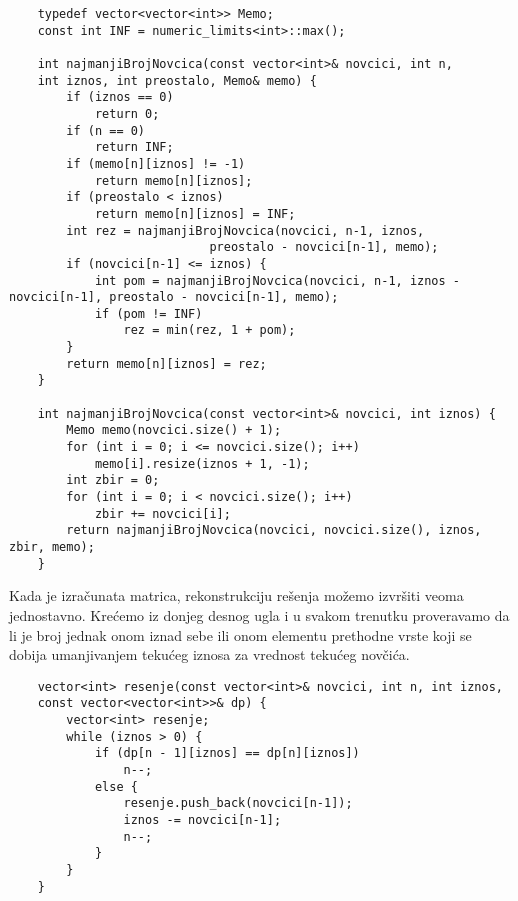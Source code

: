\documentclass{article}
\begin{document}
\begin{lstlisting}
    typedef vector<vector<int>> Memo;
    const int INF = numeric_limits<int>::max();

    int najmanjiBrojNovcica(const vector<int>& novcici, int n,
    int iznos, int preostalo, Memo& memo) {
        if (iznos == 0)
            return 0;
        if (n == 0)
            return INF;
        if (memo[n][iznos] != -1)
            return memo[n][iznos];
        if (preostalo < iznos)
            return memo[n][iznos] = INF;
        int rez = najmanjiBrojNovcica(novcici, n-1, iznos,
                            preostalo - novcici[n-1], memo);
        if (novcici[n-1] <= iznos) {
            int pom = najmanjiBrojNovcica(novcici, n-1, iznos -               novcici[n-1], preostalo - novcici[n-1], memo);
            if (pom != INF)
                rez = min(rez, 1 + pom);
        }
        return memo[n][iznos] = rez;
    }

    int najmanjiBrojNovcica(const vector<int>& novcici, int iznos) {
        Memo memo(novcici.size() + 1);
        for (int i = 0; i <= novcici.size(); i++)
            memo[i].resize(iznos + 1, -1);
        int zbir = 0;
        for (int i = 0; i < novcici.size(); i++)
            zbir += novcici[i];
        return najmanjiBrojNovcica(novcici, novcici.size(), iznos, zbir, memo);
    }
\end{lstlisting}
Kada je izračunata matrica, rekonstrukciju rešenja možemo izvršiti veoma jednostavno. Krećemo iz donjeg desnog ugla i u svakom trenutku proveravamo
da li je broj jednak onom iznad sebe ili onom elementu prethodne vrste koji se
dobija umanjivanjem tekućeg iznosa za vrednost tekućeg novčića. 
\begin{lstlisting}
    vector<int> resenje(const vector<int>& novcici, int n, int iznos,
    const vector<vector<int>>& dp) {
        vector<int> resenje;
        while (iznos > 0) {
            if (dp[n - 1][iznos] == dp[n][iznos])
                n--;
            else {
                resenje.push_back(novcici[n-1]);
                iznos -= novcici[n-1];
                n--;
            }
        }
    }
\end{lstlisting}
\end{document}
